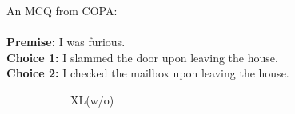 \documentclass[runningheads]{llncs}
\newcommand{\crosssymbol}{{\color{red} \XSolidBrush} }
\newcommand{\checksymbol}{{\color{green} \Checkmark} }
\begin{document}
\begin{example}\label{ex:copa2}
An MCQ from COPA:\\ \\
\noindent
\textbf{Premise:} I was furious.\\
\textbf{Choice 1:} I slammed the door upon leaving the house.  \checksymbol \\
\textbf{Choice 2:} I checked the mailbox upon leaving the house. \crosssymbol
\end{example}

\begin{figure}[th!]
\centering
\begin{subfigure}[b]{0.40\textwidth}
\centering
{}
\caption{XL(w/o)}
\label{fig:copa2_o}
\end{subfigure}
\hfill
\newpage
\begin{subfigure}[b]{0.40\textwidth}
\centering

\end{subfigure}
\end{figure}
\end{document}
